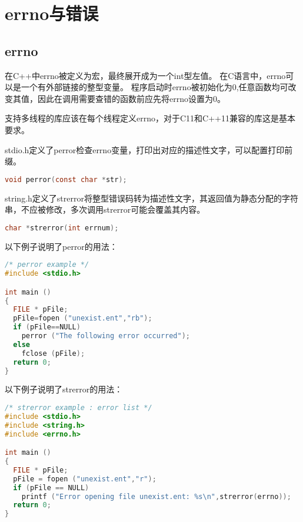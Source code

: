 
\section{errno与错误}
\subsection{errno}
在C++中errno被定义为宏，最终展开成为一个int型左值。
在C语言中，errno可以是一个有外部链接的整型变量。
程序启动时errno被初始化为0,任意函数均可改变其值，因此在调用需要查错的函数前应先将errno设置为0。


支持多线程的库应该在每个线程定义errno，对于C11和C++11兼容的库这是基本要求。

stdio.h定义了perror检查errno变量，打印出对应的描述性文字，可以配置打印前缀。
\begin{lstlisting}[language=C]
void perror(const char *str);
\end{lstlisting}

string.h定义了strerror将整型错误码转为描述性文字，其返回值为静态分配的字符串，不应被修改，多次调用strerror可能会覆盖其内容。
\begin{lstlisting}[language=C]
char *strerror(int errnum);
\end{lstlisting}

以下例子说明了perror的用法：
\begin{lstlisting}[language=C++]
/* perror example */
#include <stdio.h>

int main ()
{
  FILE * pFile;
  pFile=fopen ("unexist.ent","rb");
  if (pFile==NULL)
    perror ("The following error occurred");
  else
    fclose (pFile);
  return 0;
}
\end{lstlisting}

以下例子说明了strerror的用法：
\begin{lstlisting}[language=C++]
/* strerror example : error list */
#include <stdio.h>
#include <string.h>
#include <errno.h>

int main ()
{
  FILE * pFile;
  pFile = fopen ("unexist.ent","r");
  if (pFile == NULL)
    printf ("Error opening file unexist.ent: %s\n",strerror(errno));
  return 0;
}
\end{lstlisting} 




